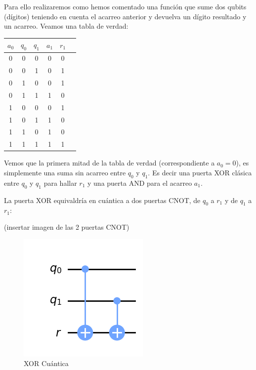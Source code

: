 Para ello realizaremos como hemos comentado una función que sume dos qubits (dígitos) teniendo en cuenta el acarreo anterior y devuelva un dígito resultado y un acarreo.
Veamos una tabla de verdad:

\begin{center}
    \begin{tabular}{|c|c|c||c|c|c|}
        \hline
        $a_0$ & $q_0$ & $q_1$ & $a_1$ & $r_1$\\
        \hline
        \hline
        0 & 0 & 0 & 0 & 0 \\
        0 & 0 & 1 & 0 & 1 \\
        0 & 1 & 0 & 0 & 1 \\
        0 & 1 & 1 & 1 & 0 \\
        \hline
        1 & 0 & 0 & 0 & 1 \\
        1 & 0 & 1 & 1 & 0 \\
        1 & 1 & 0 & 1 & 0 \\
        1 & 1 & 1 & 1 & 1 \\
        \hline
    \end{tabular}
\end{center}

Vemos que la primera mitad de la tabla de verdad (correspondiente a $a_0=0$), es simplemente una suma sin acarreo entre $q_0$ y $q_1$. Es decir una puerta XOR clásica entre $q_0$ y $q_1$ para hallar $r_1$ y una puerta AND para el acarreo $a_1$. 

La puerta XOR equivaldría en cuántica a dos puertas CNOT, de $q_0$ a $r_1$ y de $q_1$ a $r_1$:

(insertar imagen de las 2 puertas CNOT)

\begin{figure}
    \centering
    \includegraphics[width=0.5\linewidth]{XOR Cuantica.png}
    \caption{XOR Cuántica}
    \label{fig:XORCuantica}
\end{figure}

